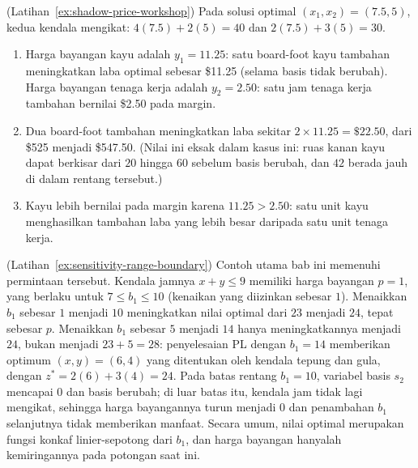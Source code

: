 \begin{solution}(Latihan~\ref{ex:shadow-price-workshop})
Pada solusi optimal $(x_1, x_2) = (7.5, 5)$, kedua kendala mengikat: $4(7.5) + 2(5) = 40$ dan $2(7.5) + 3(5) = 30$.

\begin{enumerate}
\item Harga bayangan kayu adalah $y_1 = 11.25$: satu board-foot kayu tambahan meningkatkan laba optimal sebesar \$11.25 (selama basis tidak berubah). Harga bayangan tenaga kerja adalah $y_2 = 2.50$: satu jam tenaga kerja tambahan bernilai \$2.50 pada margin.
\item Dua board-foot tambahan meningkatkan laba sekitar $2 \times 11.25 = \$22.50$, dari \$525 menjadi \$547.50. (Nilai ini eksak dalam kasus ini: ruas kanan kayu dapat berkisar dari $20$ hingga $60$ sebelum basis berubah, dan $42$ berada jauh di dalam rentang tersebut.)
\item Kayu lebih bernilai pada margin karena $11.25 > 2.50$: satu unit kayu menghasilkan tambahan laba yang lebih besar daripada satu unit tenaga kerja.
\end{enumerate}
\end{solution}

\begin{solution}(Latihan~\ref{ex:sensitivity-range-boundary})
Contoh utama bab ini memenuhi permintaan tersebut. Kendala jamnya $x + y \leq 9$ memiliki harga bayangan $p = 1$, yang berlaku untuk $7 \leq b_1 \leq 10$ (kenaikan yang diizinkan sebesar $1$). Menaikkan $b_1$ sebesar $1$ menjadi $10$ meningkatkan nilai optimal dari $23$ menjadi $24$, tepat sebesar $p$. Menaikkan $b_1$ sebesar $5$ menjadi $14$ hanya meningkatkannya menjadi $24$, bukan menjadi $23 + 5 = 28$: penyelesaian PL dengan $b_1 = 14$ memberikan optimum $(x, y) = (6, 4)$ yang ditentukan oleh kendala tepung dan gula, dengan $z^* = 2(6) + 3(4) = 24$. Pada batas rentang $b_1 = 10$, variabel basis $s_2$ mencapai $0$ dan basis berubah; di luar batas itu, kendala jam tidak lagi mengikat, sehingga harga bayangannya turun menjadi $0$ dan penambahan $b_1$ selanjutnya tidak memberikan manfaat. Secara umum, nilai optimal merupakan fungsi konkaf linier-sepotong dari $b_1$, dan harga bayangan hanyalah kemiringannya pada potongan saat ini.
\end{solution}
